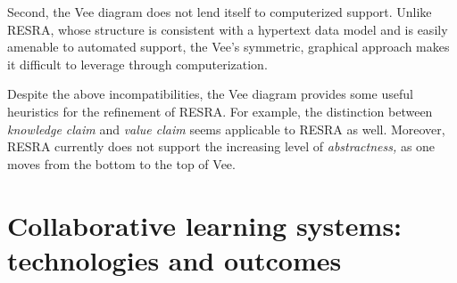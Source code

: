 Second, the Vee diagram does not lend itself to computerized support.
Unlike RESRA, whose structure is consistent with a hypertext data model and
is easily amenable to automated support, the Vee's symmetric, graphical
approach makes it difficult to leverage through computerization.

Despite the above incompatibilities, the Vee diagram provides some useful
heuristics for the refinement of RESRA. For example, the distinction
between {\it knowledge claim\/} and {\it value claim\/} seems applicable to
RESRA as well. Moreover, RESRA currently does not support the increasing
level of {\it abstractness,\/} as one moves from the bottom to the top of
Vee. 



\section{Collaborative learning systems: technologies and outcomes}
\label{sec:cscl-systems}

